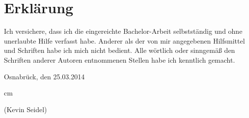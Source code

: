\documentclass{AGTI}
\begin{document}
%
%
%
%

%
%
%
%

%

%


\cleardoublepage

  \vspace*{15cm}

  \chapter*{Erklärung}

  \thispagestyle{empty}

  Ich versichere, dass ich die eingereichte Bachelor-Arbeit selbstständig und ohne
  unerlaubte Hilfe verfasst habe. Anderer als der von mir angegebenen Hilfsmittel und
  Schriften habe ich mich nicht bedient. Alle wörtlich oder sinngemäß den Schriften
  anderer Autoren entnommenen Stellen habe ich kenntlich gemacht.

  \bigskip\bigskip

\begin{flushright}
Osnabrück, den 25.03.2014
\end{flushright}
 cm

 \bigskip
 \bigskip
 \bigskip
 \bigskip
 \bigskip

 (Kevin Seidel)
\end{document}
